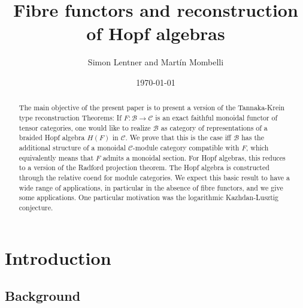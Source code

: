 \documentclass[11pt]{amsart}
\title[Fibre functors and reconstruction of Hopf algebras]
{Fibre functors and reconstruction of Hopf algebras}
\author[    Lentner and Mombelli]{ Simon Lentner and Mart\'in Mombelli
 }
\newcommand{\vc}{{\mathcal C}}
\newcommand{\Bc}{{\mathcal B}}
\renewcommand{\_}[1]{\mbox{$_{\left( #1 \right)}$}}
\theoremstyle{plain}
\numberwithin{equation}{section}
\theoremstyle{definition}
\theoremstyle{remark}
\theoremstyle{introTheorems}
\begin{document}
\address{Universität Hamburg
\newline \indent
Bundesstrassee 55, D – 20 
\newline {} Hamburg, Deutschland}


\address{Facultad de Matem\'atica, Astronom\'\i a y F\'\i sica
\newline \indent
Universidad Nacional de C\'ordoba
\newline
\indent CIEM -- CONICET
\newline \indent Medina Allende s/n
\newline
\indent (5000) Ciudad Universitaria, C\'ordoba, Argentina}


\begin{abstract}
The main objective of the present paper is to present a version of the Tannaka-Krein type reconstruction  Theorems:  If $F:\Bc\to \vc$ is an exact faithful monoidal functor of tensor categories, one would like to realize $\Bc$ as  category of representations of a braided Hopf algebra $H(F)$ in $\vc$. We prove that this is the case iff $\Bc$ has the additional structure of a monoidal $\vc$-module category compatible with $F$, which equivalently means that $F$ admits a monoidal section. For Hopf algebras, this reduces to a version of the Radford projection theorem. The Hopf algebra is constructed through the  relative coend for module categories. We expect this basic result to have a wide range of applications, in particular in the absence of fibre functors, and we give some applications. One particular motivation was the logarithmic Kazhdan-Lusztig conjecture. 
\end{abstract}

 \date{\today}
\maketitle

\tableofcontents


\section*{Introduction}

\subsection*{Background}
\end{document}
